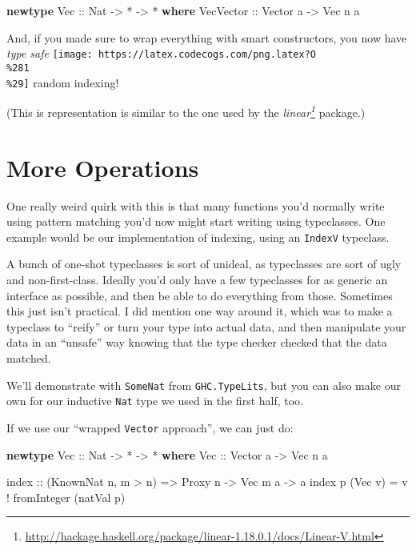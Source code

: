 \documentclass[]{article}
\newenvironment{Shaded}{}{}
\newcommand{\DataTypeTok}[1]{\textcolor[rgb]{0.56,0.13,0.00}{#1}}
\newcommand{\FunctionTok}[1]{\textcolor[rgb]{0.02,0.16,0.49}{#1}}
\newcommand{\KeywordTok}[1]{\textcolor[rgb]{0.00,0.44,0.13}{\textbf{#1}}}
\newcommand{\NormalTok}[1]{#1}
\newcommand{\OtherTok}[1]{\textcolor[rgb]{0.00,0.44,0.13}{#1}}
\renewcommand{\href}[2]{#2\footnote{\url{#1}}}
\begin{document}
\begin{Shaded}
\begin{Highlighting}[]
\KeywordTok{newtype} \DataTypeTok{Vec}\OtherTok{ ::} \DataTypeTok{Nat} \OtherTok{->} \FunctionTok{*} \OtherTok{->} \FunctionTok{*} \KeywordTok{where}
    \DataTypeTok{VecVector}\OtherTok{ ::} \DataTypeTok{Vector}\NormalTok{ a }\OtherTok{->} \DataTypeTok{Vec}\NormalTok{ n a}
\end{Highlighting}
\end{Shaded}

And, if you made sure to wrap everything with smart constructors, you now have
\emph{type safe}
\texttt{[image: https://latex.codecogs.com/png.latex?O\\\%281\\\%29]} random
indexing!

(This is representation is similar to the one used by the
\emph{\href{http://hackage.haskell.org/package/linear-1.18.0.1/docs/Linear-V.html}{linear}}
package.)

\hypertarget{more-operations}{%
\section{More Operations}\label{more-operations}}

One really weird quirk with this is that many functions you'd normally write
using pattern matching you'd now might start writing using typeclasses. One
example would be our implementation of indexing, using an \texttt{IndexV}
typeclass.

A bunch of one-shot typeclasses is sort of unideal, as typeclasses are sort of
ugly and non-first-class. Ideally you'd only have a few typeclasses for as
generic an interface as possible, and then be able to do everything from those.
Sometimes this just isn't practical. I did mention one way around it, which was
to make a typeclass to ``reify'' or turn your type into actual data, and then
manipulate your data in an ``unsafe'' way knowing that the type checker checked
that the data matched.

We'll demonstrate with \texttt{SomeNat} from \texttt{GHC.TypeLits}, but you can
also make our own for our inductive \texttt{Nat} type we used in the first half,
too.

If we use our ``wrapped \texttt{Vector} approach'', we can just do:

\begin{Shaded}
\begin{Highlighting}[]
\KeywordTok{newtype} \DataTypeTok{Vec}\OtherTok{ ::} \DataTypeTok{Nat} \OtherTok{->} \FunctionTok{*} \OtherTok{->} \FunctionTok{*} \KeywordTok{where}
    \DataTypeTok{Vec}\OtherTok{ ::} \DataTypeTok{Vector}\NormalTok{ a }\OtherTok{->} \DataTypeTok{Vec}\NormalTok{ n a}

\NormalTok{index}\OtherTok{ ::}\NormalTok{ (}\DataTypeTok{KnownNat}\NormalTok{ n, m }\FunctionTok{>}\NormalTok{ n) }\OtherTok{=>} \DataTypeTok{Proxy}\NormalTok{ n }\OtherTok{->} \DataTypeTok{Vec}\NormalTok{ m a }\OtherTok{->}\NormalTok{ a}
\NormalTok{index p (}\DataTypeTok{Vec}\NormalTok{ v) }\FunctionTok{=}\NormalTok{ v }\FunctionTok{!}\NormalTok{ fromInteger (natVal p)}
\end{Highlighting}
\end{Shaded}
\end{document}
